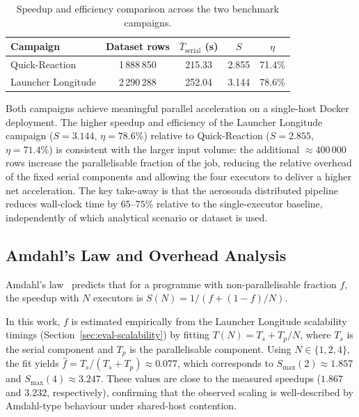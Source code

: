 \begin{table}[htbp]
\centering
\caption{Speedup and efficiency comparison across the two benchmark campaigns.}
\label{tab:speedup-comparison}
\begin{tabular}{lcccc}
\toprule
Campaign & Dataset rows & $\bar{T}_{\text{serial}}$ (s) &
$S$ & $\eta$ \\
\midrule
Quick-Reaction   & 1\,888\,850 & 215.33 & 2.855 & 71.4\% \\
Launcher Longitude & 2\,290\,288 & 252.04 & 3.144 & 78.6\% \\
\bottomrule
\end{tabular}
\end{table}

Both campaigns achieve meaningful parallel acceleration on a single-host Docker
deployment.  The higher speedup and efficiency of the Launcher Longitude campaign
($S=3.144$, $\eta=78.6\%$) relative to Quick-Reaction ($S=2.855$, $\eta=71.4\%$)
is consistent with the larger input volume: the additional $\approx400\,000$ rows
increase the parallelisable fraction of the job, reducing the relative overhead of
the fixed serial components and allowing the four executors to deliver a higher net
acceleration.  The key take-away is that the \gls{aerosouda} distributed pipeline
reduces wall-clock time by $65$--$75\%$ relative to the single-executor baseline,
independently of which analytical scenario or dataset is used.

\subsection{Amdahl's Law and Overhead Analysis}
\label{subsec:eval-amdahl}

Amdahl's law~\parencite{amdahl1967} predicts that for a programme with non-parallelisable
fraction $f$, the speedup with $N$ executors is
$S(N)=1/(f+(1-f)/N)$.

In this work, \(f\) is estimated empirically from the Launcher Longitude
scalability timings (Section~\ref{sec:eval-scalability}) by fitting \(T(N)=T_s+T_p/N\),
where \(T_s\) is the serial component and \(T_p\) is the parallelisable component.
Using \(N\in\{1,2,4\}\), the fit yields \(\hat{f}=T_s/(T_s+T_p)\approx0.077\), which
corresponds to \(S_{\max}(2)\approx1.857\) and \(S_{\max}(4)\approx3.247\).  These values
are close to the measured speedups (\(1.867\) and \(3.232\), respectively), confirming
that the observed scaling is well-described by Amdahl-type behaviour under shared-host
contention.

